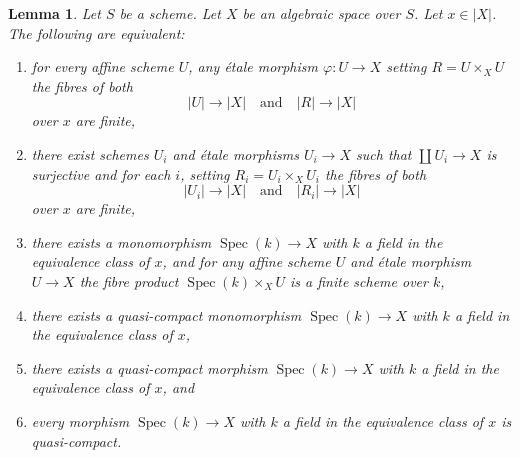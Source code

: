 \documentclass{stacks-project}
\theoremstyle{plain}
\newtheorem{lemma}[subsection]{Lemma}
\theoremstyle{definition}
\theoremstyle{remark}
\numberwithin{equation}{subsection}
\def\Spec{\mathop{\mathrm{Spec}}}
\begin{document}
\begin{lemma}
\label{lemma-UR-finite-above-x}
Let $S$ be a scheme. Let $X$ be an algebraic space over $S$.
Let $x \in |X|$. The following are equivalent:
\begin{enumerate}
\item for every affine scheme $U$, any \'etale morphism
$\varphi : U \to X$ setting $R = U \times_X U$ the fibres of both
$$
|U| \longrightarrow |X|
\quad\text{and}\quad
|R| \longrightarrow |X|
$$
over $x$ are finite,
\item there exist schemes $U_i$ and \'etale morphisms
$U_i \to X$ such that $\coprod U_i \to X$ is surjective and for each
$i$, setting $R_i = U_i \times_X U_i$ the fibres of both
$$
|U_i| \longrightarrow |X|
\quad\text{and}\quad
|R_i| \longrightarrow |X|
$$
over $x$ are finite,
\item there exists a monomorphism $\Spec(k) \to X$ with $k$ a field
in the equivalence class of $x$, and for any affine scheme $U$ and \'etale
morphism $U \to X$ the fibre product $\Spec(k) \times_X U$ is
a finite scheme over $k$,
\item there exists a quasi-compact monomorphism $\Spec(k) \to X$
with $k$ a field in the equivalence class of $x$,
\item there exists a quasi-compact morphism $\Spec(k) \to X$
with $k$ a field in the equivalence class of $x$, and
\item every morphism $\Spec(k) \to X$ with $k$ a field in the
equivalence class of $x$ is quasi-compact.
\end{enumerate}
\end{lemma}
\end{document}
